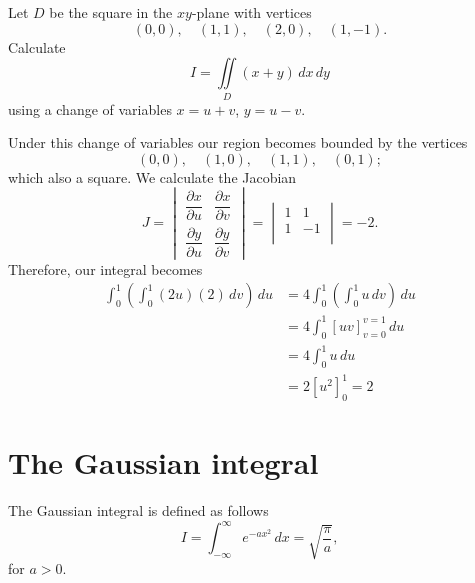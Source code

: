 \begin{example}
    Let $D$ be the square in the $xy$-plane with vertices \[ (0,0), \quad (1, 1), \quad (2, 0), \quad (1, -1). \] Calculate \[ I = \iint\limits_{D} (x + y) \, dx \, dy \] using a change of variables $x = u + v$, $y = u - v$.
    
    Under this change of variables our region becomes bounded by the vertices \[ (0,0), \quad (1, 0), \quad (1, 1), \quad (0, 1); \] which also a square.
    We calculate the Jacobian 
    \[
        J =
        \begin{vmatrix}
            \dfrac{\partial x}{\partial u} & \dfrac{\partial x}{\partial v} \\[3ex]
            \dfrac{\partial y}{\partial u} & \dfrac{\partial y}{\partial v}
        \end{vmatrix}
        = \begin{vmatrix}
            1 & 1 \\
            1 & -1 \\
        \end{vmatrix}
        = -2.
    \]
    Therefore, our integral becomes 
    \begin{align*}
        \int_{0}^{1} \left( \int_{0}^{1} (2u) (2) \, dv \right) \, du &= 4 \int_{0}^{1} \left( \int_{0}^{1} u \, dv \right) \, du \\
        &= 4 \int_{0}^{1} \left[ u v \right]_{v = 0}^{v = 1} \, du \\
        &= 4 \int_{0}^{1} u \, du \\
        &= 2 \left[ u^2 \right]_{0}^{1} = 2
    \end{align*}
\end{example}

\section{The Gaussian integral}

\begin{definition}
    The Gaussian integral is defined as follows \[ I = \int_{-\infty}^{\infty} e^{-a x^2} \, dx = \sqrt{\frac{\pi}{a}}, \] for $a > 0$.
\end{definition}

